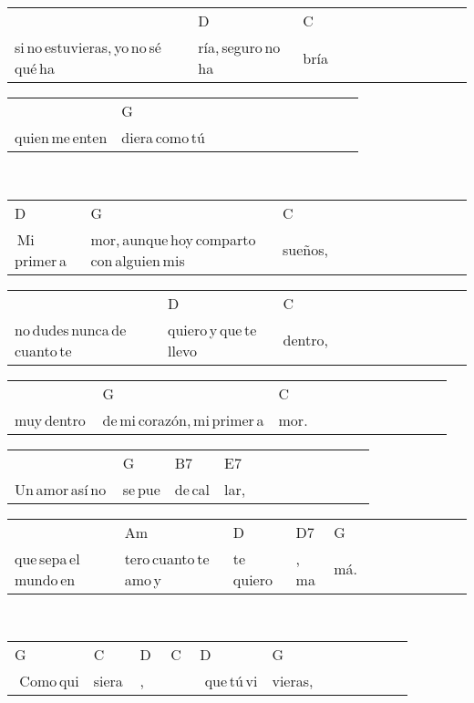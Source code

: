 \begin{multicols}{2}
\begin{minipage}{\columnwidth}
\noindent
\begin{tabular}{llllllllllll}
&D&C\\
si\,no\,estuvieras,\,yo\,no\,sé\,qué\,ha&ría,\,seguro\,no\,ha&bría
\end{tabular}

\noindent
\begin{tabular}{llllllllllll}
&G\\
quien\,me\,enten&diera\,como\,tú
\end{tabular}
\end{minipage}\\

\noindent
\begin{minipage}{\columnwidth}
\noindent
\noindent
\begin{tabular}{llllllllllll}
D&G&C\\
\,Mi\,primer\,a&mor,\,aunque\,hoy\,comparto\,con\,alguien\,mis\,&sueños,
\end{tabular}

\noindent
\begin{tabular}{llllllllllll}
&D&C\\
no\,dudes\,nunca\,de\,cuanto\,te\,&quiero\,y\,que\,te\,llevo\,&dentro,
\end{tabular}

\noindent
\begin{tabular}{llllllllllll}
&G&C\\
muy\,dentro\,&de\,mi\,corazón,\,mi\,primer\,a&mor.
\end{tabular}

\noindent
\begin{tabular}{llllllllllll}
&G&B7&E7\\
Un\,amor\,así\,no\,&se\,pue&de\,cal&lar,
\end{tabular}

\noindent
\begin{tabular}{llllllllllll}
&Am&D&D7&G\\
que\,sepa\,el\,mundo\,en&tero\,cuanto\,te\,amo\,y\,&te\,quiero&,\,ma&má.
\end{tabular}
\end{minipage}\\

\noindent
\begin{minipage}{\columnwidth}
\noindent
\noindent
\begin{tabular}{llllllllllll}
G&C&D&C&D&G\\
\,\,Como\,qui&siera\,&,\,\,\,\,\,&\,\,\,\,\,\,&\,\,que\,tú\,vi&vieras,
\end{tabular}


\end{minipage}
\end{multicols}
